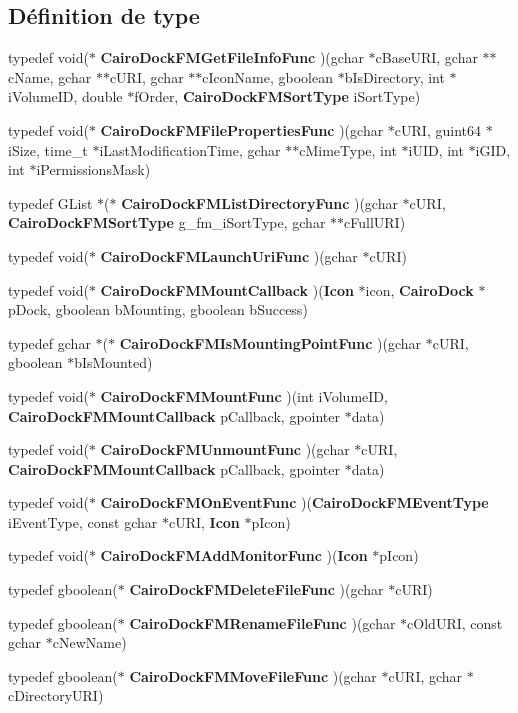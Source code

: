 \subsection*{Définition de type}
\begin{CompactItemize}
\item 
typedef void($\ast$ {\bf CairoDockFMGetFileInfoFunc} )(gchar $\ast$cBaseURI, gchar $\ast$$\ast$cName, gchar $\ast$$\ast$cURI, gchar $\ast$$\ast$cIconName, gboolean $\ast$bIsDirectory, int $\ast$iVolumeID, double $\ast$fOrder, {\bf CairoDockFMSortType} iSortType)
\item 
typedef void($\ast$ {\bf CairoDockFMFilePropertiesFunc} )(gchar $\ast$cURI, guint64 $\ast$iSize, time\_\-t $\ast$iLastModificationTime, gchar $\ast$$\ast$cMimeType, int $\ast$iUID, int $\ast$iGID, int $\ast$iPermissionsMask)
\item 
typedef GList $\ast$($\ast$ {\bf CairoDockFMListDirectoryFunc} )(gchar $\ast$cURI, {\bf CairoDockFMSortType} g\_\-fm\_\-iSortType, gchar $\ast$$\ast$cFullURI)
\item 
typedef void($\ast$ {\bf CairoDockFMLaunchUriFunc} )(gchar $\ast$cURI)
\item 
typedef void($\ast$ {\bf CairoDockFMMountCallback} )({\bf Icon} $\ast$icon, {\bf CairoDock} $\ast$pDock, gboolean bMounting, gboolean bSuccess)
\item 
typedef gchar $\ast$($\ast$ {\bf CairoDockFMIsMountingPointFunc} )(gchar $\ast$cURI, gboolean $\ast$bIsMounted)
\item 
typedef void($\ast$ {\bf CairoDockFMMountFunc} )(int iVolumeID, {\bf CairoDockFMMountCallback} pCallback, gpointer $\ast$data)
\item 
typedef void($\ast$ {\bf CairoDockFMUnmountFunc} )(gchar $\ast$cURI, {\bf CairoDockFMMountCallback} pCallback, gpointer $\ast$data)
\item 
typedef void($\ast$ {\bf CairoDockFMOnEventFunc} )({\bf CairoDockFMEventType} iEventType, const gchar $\ast$cURI, {\bf Icon} $\ast$pIcon)
\item 
typedef void($\ast$ {\bf CairoDockFMAddMonitorFunc} )({\bf Icon} $\ast$pIcon)
\item 
typedef gboolean($\ast$ {\bf CairoDockFMDeleteFileFunc} )(gchar $\ast$cURI)
\item 
typedef gboolean($\ast$ {\bf CairoDockFMRenameFileFunc} )(gchar $\ast$cOldURI, const gchar $\ast$cNewName)
\item 
typedef gboolean($\ast$ {\bf CairoDockFMMoveFileFunc} )(gchar $\ast$cURI, gchar $\ast$cDirectoryURI)
\end{CompactItemize}
